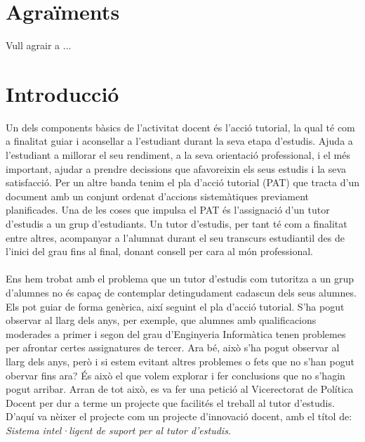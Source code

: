 \documentclass[12pt,a4paper,catalan]{article}
\begin{document}
\newpage 

\section*{Agraïments}

Vull agrair a ... 

\newpage
\thispagestyle{empty}
{\hypersetup{linkcolor=black}
	\tableofcontents
}
\thispagestyle{empty}
\newpage

\setcounter{page}{1}


\section{Introducció}
Un dels components bàsics de l'activitat docent és l'acció tutorial, la qual té com a finalitat guiar i aconsellar a l'estudiant durant la seva etapa d'estudis. Ajuda a l'estudiant a millorar el seu rendiment, a la seva orientació professional, i el més important, ajudar a prendre decissions que afavoreixin els seus estudis i la seva satisfacció. Per un altre banda tenim el pla d'acció tutorial (PAT) que tracta d'un document amb un conjunt ordenat d'accions sistemàtiques previament planificades. Una de les coses que impulsa el PAT és l'assignació d'un tutor d'estudis a un grup d'estudiants. Un tutor d'estudis, per tant té com a finalitat entre altres, acompanyar a l'alumnat durant el seu transcurs estudiantil des de l'inici del grau fins al final, donant consell per cara al món professional.
\\
\\
Ens hem trobat amb el problema que un tutor d'estudis com tutoritza a un grup d'alumnes no és capaç de contemplar detingudament cadascun dels seus alumnes. Els pot guiar de forma genèrica, així seguint el pla d'acció tutorial. S'ha pogut observar al llarg dels anys, per exemple, que alumnes amb qualificacions moderades a primer i segon del grau d'Enginyeria Informàtica tenen problemes per afrontar certes assignatures de tercer. Ara bé, això s'ha pogut observar al llarg dels anys, però i si estem evitant altres problemes o fets que no s'han pogut obervar fins ara? És això el que volem explorar i fer conclusions que no s'hagin pogut arribar. Arran de tot això, es va fer una petició al Vicerectorat de Política Docent per dur a terme un projecte que facilités el treball al tutor d'estudis. D'aquí va nèixer el projecte com un projecte d'innovació docent, amb el títol de: \textit{Sistema intel·ligent de suport per al tutor d'estudis}.
\\
\end{document}
